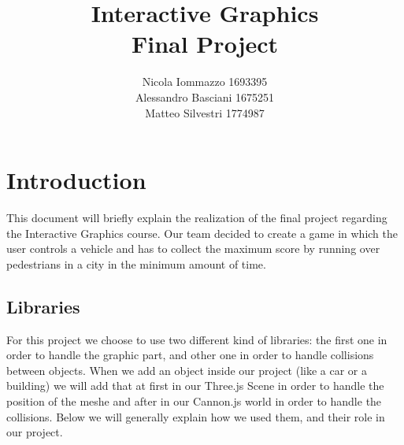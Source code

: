 \documentclass[a4paper, 11pt, titlepage]{report}
\begin{document}
\titleformat{\chapter}[display]
    {\normalfont\huge\bfseries}{\chaptertitlename\ \thechapter}{30pt}{\Huge}
\titlespacing*{\chapter}{0pt}{0pt}{20pt}

\hypersetup{
	linkcolor=black,
	citecolor=black,
	urlcolor=black
}

\title{
	Interactive Graphics\\
	\large Final Project
}
\author{Nicola Iommazzo 1693395\\
		Alessandro Basciani 1675251\\
		Matteo Silvestri 1774987\\ }
\date{}
\maketitle

\tableofcontents

%
%

\chapter{Introduction}
    This document will briefly explain the realization of the final project regarding the Interactive Graphics course. Our team decided to create a game in which the user controls a vehicle and has to collect the maximum score by running over pedestrians in a city in the minimum amount of time.

 	\section{Libraries}
 		\par For this project we choose to use two different kind of libraries: the first one in order to handle the graphic part, and other one in order to handle collisions between objects. When we add an object inside our project (like a car or a building) we will add that at first in our Three.js Scene in order to handle the position of the meshe and after in our Cannon.js world in order to handle the collisions. Below we will generally explain how we used them, and their role in our project. 
\end{document}

